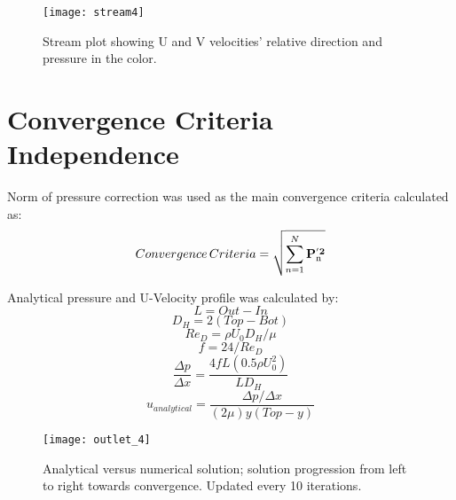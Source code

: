 \documentclass[10pt,english]{article}
\begin{document}
\vspace{-10pt}
\begin{figure}[H]
\centering
\texttt{[image: stream4]}
\vspace{-5pt}
\caption{Stream plot showing U and V velocities' relative direction and pressure in the color.}
\label{f:3b}
\end{figure}




\FloatBarrier
\section{Convergence Criteria Independence}



\noindent Norm of pressure correction was used as the main convergence criteria calculated as:
    \begin{equation}
      Convergence\,Criteria = \sqrt{\sum_{n=1}^N \bf P_{\rm n}^{'2}}
    \end{equation}


\noindent Analytical pressure and U-Velocity profile was calculated by:
\begin{equation}
            L = Out-In
\end{equation}
\begin{equation}
            D_H = 2 (Top-Bot)
            \end{equation}
            \begin{equation}
            Re_D = \rho U_0 D_H / \mu
            \end{equation}
            \begin{equation}
            f = 24/Re_D
            \end{equation}
            \begin{equation}
            \frac{\Delta p}{\Delta x} = \frac{4 f L (0.5 \rho U_0^2)}{L D_H}
            \end{equation}
            \begin{equation}
            u_{analytical} = \frac{{\Delta p}/{\Delta x}}{(2 \mu) y (Top-y)}
            \end{equation}

\begin{figure}[H]
\centering
\texttt{[image: outlet\_4]}
\vspace{-5pt}
\caption{Analytical versus numerical solution; solution progression from left to right towards convergence.  Updated every 10 iterations. }
\label{f:3b}
\end{figure}
\end{document}
